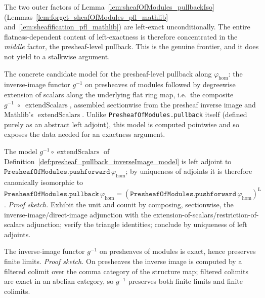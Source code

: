The two outer factors of Lemma~\ref{lem:sheafOfModules_pullbackIso}
(Lemmas~\ref{lem:forget_sheafOfModules_pfl_mathlib}
and~\ref{lem:sheafification_pfl_mathlib}) are left-exact unconditionally. The entire
flatness-dependent content of left-exactness is therefore concentrated in the
\emph{middle} factor, the presheaf-level pullback. This is the genuine frontier, and
it does not yield to a stalkwise argument.

\begin{definition}
  \label{def:presheaf_pullback_inverseImage_model}
  The concrete candidate model for the presheaf-level pullback along \(\varphi_{\mathrm{hom}}\):
  the inverse-image functor \(g^{-1}\) on presheaves of modules followed by degreewise
  extension of scalars along the underlying flat ring map, i.e.\ the composite
  \(g^{-1} \;\circ\; \operatorname{extendScalars}\), assembled sectionwise from the
  presheaf inverse image and Mathlib's \(\operatorname{extendScalars}\). Unlike
  \texttt{PresheafOfModules.pullback} itself (defined purely as an abstract left
  adjoint), this model is computed pointwise and so exposes the data needed for an
  exactness argument.
\end{definition}

\begin{lemma}
  \label{lem:presheaf_pullback_inverseImage_adjoint}
  The model \(g^{-1} \circ \operatorname{extendScalars}\) of
  Definition~\ref{def:presheaf_pullback_inverseImage_model} is left adjoint to
  \(\texttt{PresheafOfModules.pushforward}\,\varphi_{\mathrm{hom}}\); by uniqueness of
  adjoints it is therefore canonically isomorphic to
  \(\texttt{PresheafOfModules.pullback}\,\varphi_{\mathrm{hom}}
  = (\texttt{PresheafOfModules.pushforward}\,\varphi_{\mathrm{hom}})^{\mathrm{L}}\).
  \emph{Proof sketch.} Exhibit the unit and counit by composing, sectionwise, the
  inverse-image/direct-image adjunction with the extension-of-scalars/restriction-of-scalars
  adjunction; verify the triangle identities; conclude by uniqueness of left adjoints.
\end{lemma}

\begin{lemma}
  \label{lem:presheaf_inverseImage_exact}
  The inverse-image functor \(g^{-1}\) on presheaves of modules is exact, hence
  preserves finite limits. \emph{Proof sketch.} On presheaves the inverse image is
  computed by a filtered colimit over the comma category of the structure map; filtered
  colimits are exact in an abelian category, so \(g^{-1}\) preserves both finite limits
  and finite colimits.
\end{lemma}

